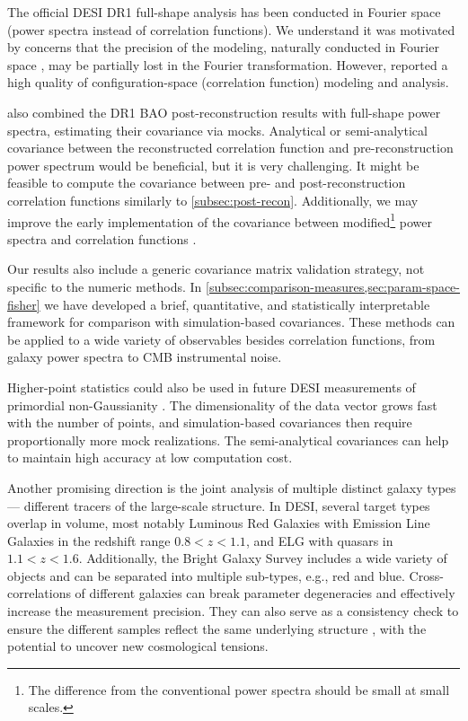 The official DESI DR1 full-shape analysis \citep{DESI2024.V.KP5} has been conducted in Fourier space (power spectra instead of correlation functions).
We understand it was motivated by concerns that the precision of the modeling, naturally conducted in Fourier space \citep{KP5s1-Maus}, may be partially lost in the Fourier transformation.
However, \cite{KP5s5-Ramirez} reported a high quality of configuration-space (correlation function) modeling and analysis.

\cite{DESI2024.V.KP5} also combined the DR1 BAO post-reconstruction results \citep{DESI2024.III.KP4} with full-shape power spectra, estimating their covariance via mocks.
Analytical or semi-analytical covariance between the reconstructed correlation function and pre-reconstruction power spectrum would be beneficial, but it is very challenging.
It might be feasible to compute the covariance between pre- and post-reconstruction correlation functions similarly to \cref{subsec:post-recon}.
Additionally, we may improve the early implementation of the \rascalc{} covariance between modified\footnote{The difference from the conventional power spectra should be small at small scales.} power spectra and correlation functions \citep{HIPSTER-cov}.

Our results also include a generic covariance matrix validation strategy, not specific to the numeric methods.
In \cref{subsec:comparison-measures,sec:param-space-fisher} we have developed a brief, quantitative, and statistically interpretable framework for comparison with simulation-based covariances.
These methods can be applied to a wide variety of observables besides correlation functions, from galaxy power spectra to CMB instrumental noise.

Higher-point statistics could also be used in future DESI measurements of primordial non-Gaussianity \citep[building upon the completed analysis of DR1 by][]{ChaussidonY1fnl}.
The dimensionality of the data vector grows fast with the number of points, and simulation-based covariances then require proportionally more mock realizations.
The semi-analytical covariances can help to maintain high accuracy at low computation cost.

Another promising direction is the joint analysis of multiple distinct galaxy types --- different tracers of the large-scale structure.
In DESI, several target types overlap in volume, most notably Luminous Red Galaxies \citep[LRG,][]{LRG.TS.Zhou.2023} with Emission Line Galaxies \citep[ELG,][]{ELG.TS.Raichoor.2023} in the redshift range $0.8<z<1.1$, and ELG with quasars \citep{QSO.TS.Chaussidon.2023} in $1.1<z<1.6$.
Additionally, the Bright Galaxy Survey \citep{BGS.TS.Hahn.2023} includes a wide variety of objects and can be separated into multiple sub-types, e.g., red and blue.
Cross-correlations of different galaxies can break parameter degeneracies and effectively increase the measurement precision.
They can also serve as a consistency check to ensure the different samples reflect the same underlying structure \citep[e.g., following][]{LSS-color-dependent-stochasticity}, with the potential to uncover new cosmological tensions.

